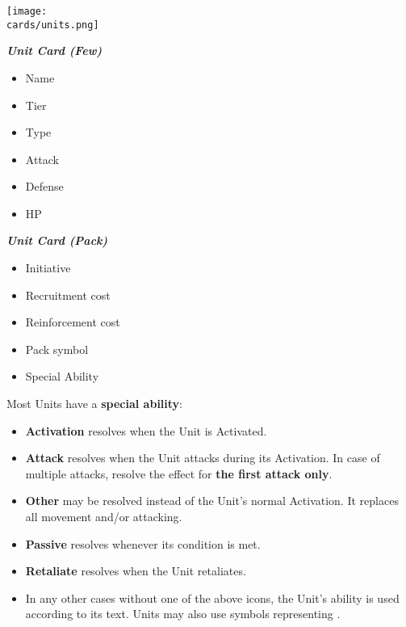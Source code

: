 \begin{multicols}{2}
\begin{center}
  \texttt{[image: \\cards/units.png]}
\end{center}
\vspace{-1em}
\begin{multicols*}{2}
  \footnotesize
  \begin{center}
    \textbf{\textit{\textcolor{darkcandyapplered}{Unit Card (Few)}}}
  \end{center}
  \begin{itemize}
    \item[\textbf{1.}] {Name}
    \item[\textbf{2.}] {Tier}
    \item[\textbf{3.}] {Type}
    \item[\textbf{4.}] {Attack}
    \item[\textbf{5.}] {Defense}
    \item[\textbf{6.}] {HP}
  \end{itemize}
  \columnbreak
  \begin{center}
    \textbf{\textit{\textcolor{darkcandyapplered}{Unit Card (Pack)}}}
  \end{center}
  \begin{itemize}
    \item[\textbf{7.}] {Initiative}
    \item[\textbf{8.}] {Recruitment cost}
    \item[\textbf{9.}] {Reinforcement cost}
    \item[\textbf{10.}]{Pack symbol}
    \item[\textbf{11.}]{Special Ability}
  \end{itemize}
\end{multicols*}

\bigbreak

Most Units have a \textbf{special ability}:\par
\begin{itemize}[wide]
  \item\textbf{Activation}  resolves when the Unit is Activated.
  \item\textbf{Attack}  resolves when the Unit attacks during its Activation.
    In case of multiple attacks, resolve the effect for \textbf{the first attack only}.
  \item\textbf{Other}  may be resolved instead of the Unit's normal Activation.
    It replaces all movement and/or attacking.
  \item\textbf{Passive}  resolves whenever its condition is met.
  \item\textbf{Retaliate}  resolves when the Unit retaliates.
  \item In any other cases without one of the above icons, the Unit's ability is used according to its text.
    Units may also use symbols representing .
\end{itemize}


\end{multicols}
